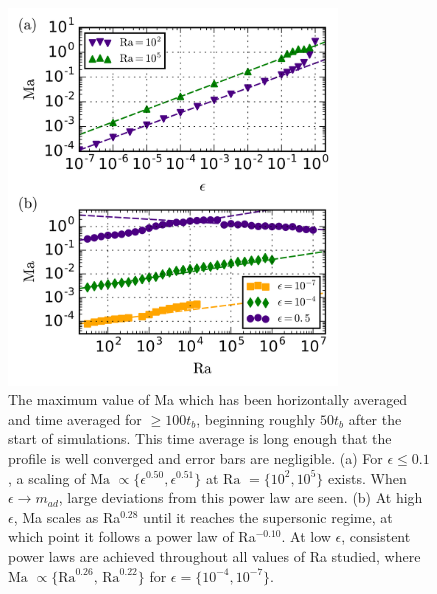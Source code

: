 \documentclass[aps, prl, twocolumn, nofootinbib, groupedaddress, amsfonts, amssymb, amsmath]{revtex4-1}
\begin{document}
\begin{figure}[t]
\includegraphics[width=3.4375in]{./figs/ma_v_eps.png}
\caption{The maximum value of Ma which has been horizontally averaged and time averaged for $\geq 100 t_b$, 
beginning roughly $50t_b$ after
the start of simulations.  This time average is long enough that the profile is well converged
and error bars are negligible. (a) For $\epsilon \leq 0.1$,
a scaling of $\text{Ma }\propto \{\epsilon^{0.50}, \epsilon^{0.51}\}$ 
at $\text{Ra }= \{10^2, 10^5\}$ exists.
When $\epsilon \rightarrow m_{ad}$, large deviations from this power law are seen.  
(b) At high $\epsilon$, Ma scales as Ra$^{0.28}$ until it reaches the supersonic regime, at which point it
follows a power law of Ra$^{-0.10}$.  At low $\epsilon$, consistent power laws are achieved throughout all
values of Ra studied, where $\text{Ma }\propto \{\text{Ra}^{0.26},\,\text{Ra}^{0.22}\}$
for $\epsilon = \{10^{-4}, 10^{-7}\}$. 
\label{fig:ma_v_eps} }
\end{figure}
\end{document}
